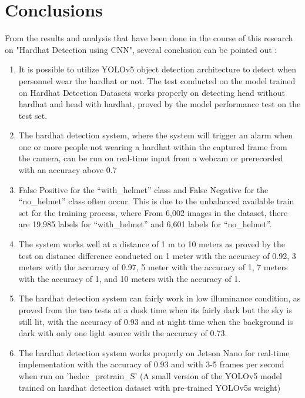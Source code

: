 \section{Conclusions}
\label{sec:kesimpulan}

\par From the results and analysis that have been done in the course of this research on "Hardhat Detection using CNN", several conclusion can be pointed out :

\begin{enumerate}
    \item It is possible to utilize YOLOv5 object detection architecture to detect when personnel wear the hardhat or not. The test conducted on the model trained on Hardhat Detection Datasets works properly on detecting head without hardhat and head with hardhat, proved by the model performance test on the test set.
    \item The hardhat detection system, where the system will trigger an alarm when one or more people not wearing a hardhat within the captured frame from the camera, can be run on real-time input from a webcam or prerecorded with an accuracy above 0.7
    \item False Positive for the “with\_helmet” class and False Negative for the “no\_helmet” class often occur. This is due to the unbalanced available train set for the training process, where From 6,002 images in the dataset, there are 19,985 labels for “with\_helmet” and 6,601 labels for “no\_helmet”.
    \item The system works well at a distance of 1 m to 10 meters as proved by the test on distance difference conducted on 1 meter with the accuracy of 0.92, 3 meters with the accuracy of 0.97, 5 meter with the accuracy of 1, 7 meters with the accuracy of 1, and 10 meters with the accuracy of 1.
    \item The hardhat detection system can fairly work in low illuminance condition, as proved from the two tests at a dusk time when its fairly dark but the sky is still lit, with the accuracy of 0.93 and at night time when the background is dark with only one light source with the accuracy of 0.73. 
    \item The hardhat detection system works properly on Jetson Nano for real-time implementation with the accuracy of 0.93 and with 3-5 frames per second when run on 'hedec\_pretrain\_S' (A small version of the YOLOv5 model trained on hardhat detection dataset with pre-trained YOLOv5s weight)
\end{enumerate}

